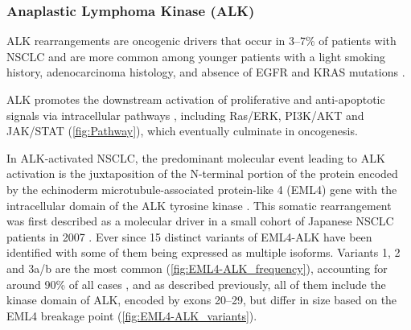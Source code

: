 \subsubsection{Anaplastic Lymphoma Kinase (ALK)} \label{sec:ALK}

ALK rearrangements are oncogenic drivers that occur in 3–7\% of patients with NSCLC and are more common among younger patients with a light smoking history, adenocarcinoma histology, and absence of EGFR and KRAS mutations \cite{NSCLC_drivers, AD_drivers}.

ALK promotes the downstream activation of proliferative and anti-apoptotic signals via intracellular pathways \cite{ALK_fusions, EML4_ALK}, including Ras\slash ERK, PI3K\slash AKT and JAK\slash STAT (\autoref{fig:Pathway}), which eventually culminate in oncogenesis.

In ALK-activated NSCLC, the predominant molecular event leading to ALK activation is the juxtaposition of the N-terminal portion of the protein encoded by the echinoderm microtubule-associated protein-like 4 (EML4) gene with the intracellular domain of the ALK tyrosine kinase \cite{ALK_identification}. This somatic rearrangement was first described as a molecular driver in a small cohort of Japanese NSCLC patients in 2007 \cite{ALK_identification}. Ever since 15 distinct variants of EML4-ALK have been identified with some of them being expressed as multiple isoforms. Variants 1, 2 and 3a\slash b are the most common  (\autoref{fig:EML4-ALK_frequency}), accounting for around 90\% of all cases \cite{EML4_ALK_variants}, and as described previously, all of them include the kinase domain of ALK, encoded by exons 20–29, but differ in size based on the EML4 breakage point  (\autoref{fig:EML4-ALK_variants}).

